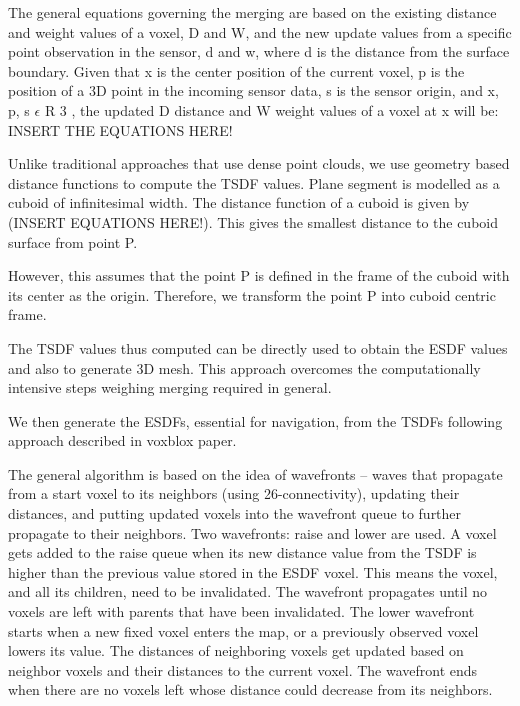 The general equations governing the merging are based on the existing distance and weight values of a voxel, D and W, and the new update values from a specific point observation
in the sensor, d and w, where d is the distance from the surface boundary. Given that x is the center position of the current voxel, p is the position of a 3D point in the incoming sensor data, s is the sensor origin, and x, p, s $\epsilon$ R 3 , the updated D distance and W weight values of a voxel at x will be: INSERT THE EQUATIONS HERE!




Unlike traditional approaches that use dense point clouds, we use geometry based distance functions to compute the TSDF values. Plane segment is modelled as a cuboid of infinitesimal width. The distance function of a cuboid is given by (INSERT EQUATIONS HERE!). This gives the smallest distance to the cuboid surface from point P.



However, this assumes that the point P is defined in the frame of the cuboid with its center as the origin. Therefore, we transform the point P into cuboid centric frame.

The TSDF values thus computed can be directly used to obtain the ESDF values and also to generate 3D mesh. This approach overcomes the computationally intensive steps weighing merging required in general.

We then generate the ESDFs, essential for navigation, from the TSDFs following approach described in voxblox paper.

The general algorithm is based on the idea of wavefronts – waves that propagate from a start voxel to its neighbors (using 26-connectivity), updating their distances, and putting
updated voxels into the wavefront queue to further propagate to their neighbors. Two wavefronts: raise and lower are used. A voxel gets added to the raise queue when its new distance value from the TSDF is higher than the previous value stored in the ESDF voxel. This means the voxel, and all its children, need to be invalidated. The wavefront propagates until no voxels are left with parents that have been invalidated. The lower wavefront starts when a new fixed voxel enters the map, or a previously observed voxel lowers its value. The distances of neighboring voxels get updated based on neighbor voxels and their distances to the current voxel. The wavefront ends when there are no voxels left whose distance could decrease from its neighbors.

